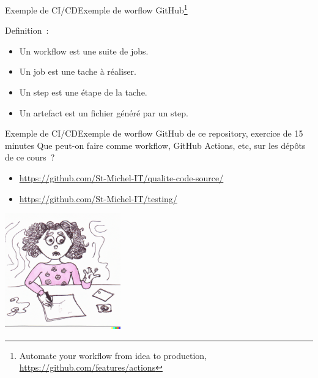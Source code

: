 \documentclass{beamer}
\begin{document}
    \begin{frame}{Exemple de CI/CD}{Exemple de worflow GitHub{\footnote{Automate your workflow from idea to production, \url{https://github.com/features/actions}}}}
        \transdissolve

        Definition~:
        \begin{itemize}
            \item Un workflow est une suite de jobs.
            \item Un job est une tache à réaliser.
            \item Un step est une étape de la tache.
            \item Un artefact est un fichier généré par un step.
        \end{itemize}
    \end{frame}

    \begin{frame}{Exemple de CI/CD}{Exemple de worflow GitHub de ce repository, exercice de 15 minutes}
        \transdissolve
        Que peut-on faire comme workflow, GitHub Actions, etc, sur les dépôts de ce cours~?
        \begin{itemize}
            \item \url{https://github.com/St-Michel-IT/qualite-code-source/}
            \item \url{https://github.com/St-Michel-IT/testing/}
        \end{itemize}
        \bigbreak
        \centering
        \includegraphics[width=5cm]{image/young-praticing-her-homework}
    \end{frame}
\end{document}
